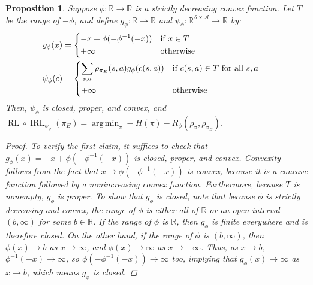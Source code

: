 \documentclass{article}
\newtheorem{proposition}{Proposition}[section]
\newcommand\bbR{\ensuremath{\mathbb{R}}} %
\newcommand\extR{\ensuremath{\overline{\mathbb{R}}}}
\newcommand\allC{\ensuremath{\mathbb{R}^{\mathcal{S}\times\mathcal{A}}}}
\DeclareMathOperator*{\argmin}{arg\,min}
\newcommand{\1}{\mathbb{I}} %
\DeclareMathOperator{\rl}{RL}
\DeclareMathOperator{\irl}{IRL} %
\begin{document}
\begin{proposition}\label{prop:riskconv}
Suppose $\phi : \bbR \rightarrow \bbR$ is a strictly decreasing convex function.
Let $T$ be the range of $-\phi$, and define $g_\phi : \bbR \rightarrow \extR$ and $\psi_\phi : \allC \rightarrow \extR$ by:
\begin{align} \begin{split} \label{eq:genericconv} 
g_\phi(x) &= \begin{dcases*} -x + \phi(-\phi^{-1}(-x)) & if $x \in T$ \\ +\infty & otherwise \end{dcases*} \\
\psi_\phi(c) &= \begin{dcases*} \sum_{s,a}\rho_{\pi_E}(s,a)g_\phi(c(s,a)) & if $c(s,a) \in T$ for all $s,a$ \\  +\infty & otherwise \end{dcases*}
\end{split} \end{align}
Then, $\psi_\phi$ is closed, proper, and convex, and ${\rl\circ\irl_{\psi_\phi}(\pi_E) = \argmin_\pi -H(\pi) - R_\phi(\rho_\pi, \rho_{\pi_E})}$.
\begin{proof}
To verify the first claim, it suffices to check that $g_\phi(x) = -x + \phi(-\phi^{-1}(-x))$ is closed, proper, and convex.
Convexity follows from the fact that $x \mapsto \phi(-\phi^{-1}(-x))$ is convex, because it is a concave function followed by a nonincreasing convex function. Furthermore, because $T$ is nonempty, $g_\phi$ is proper.
To show that $g_\phi$ is closed, note that because $\phi$ is strictly decreasing and convex, the range of $\phi$ is either all of $\bbR$ or an open interval $(b, \infty)$ for some $b \in \bbR$.
If the range of $\phi$ is $\bbR$, then $g_\phi$ is finite everywhere and is therefore closed.
On the other hand, if the range of $\phi$ is $(b, \infty)$, then $\phi(x) \rightarrow b$ as $x \rightarrow \infty$, and $\phi(x) \rightarrow \infty$ as $x \rightarrow -\infty$.
Thus, as $x \rightarrow b$, $\phi^{-1}(-x) \rightarrow \infty$, so $\phi(-\phi^{-1}(-x)) \rightarrow \infty$ too, implying that $g_\phi(x) \rightarrow \infty$ as $x \rightarrow b$, which means $g_\phi$ is closed.


\end{proof}
\end{proposition}
\end{document}
